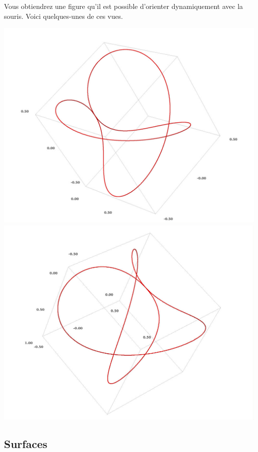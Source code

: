 \documentclass[class=report,crop=false]{standalone}
\begin{document}

Vous obtiendrez une figure qu'il est possible d'orienter dynamiquement 
avec la souris. Voici quelques-unes de ces vues.

\begin{center}
 \includegraphics[scale=0.2]{figures/archytas_curve_new1.jpg} 
\includegraphics[scale=0.2]{figures/archytas_curve_new2.jpg}  
\end{center}




\subsection{Surfaces}
\end{document}
